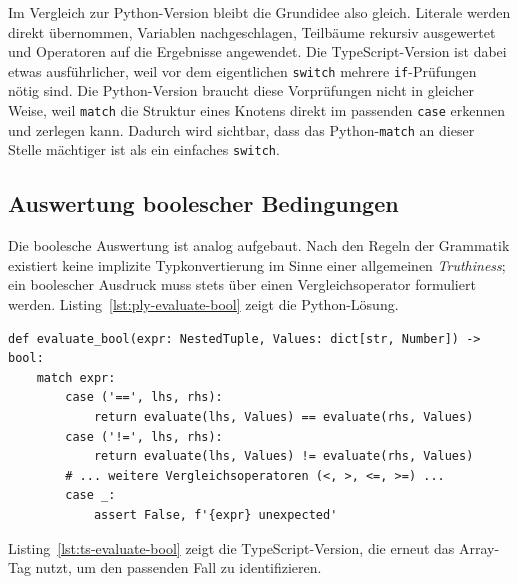 Im Vergleich zur Python-Version bleibt die Grundidee also gleich. Literale werden direkt übernommen, Variablen nachgeschlagen, Teilbäume rekursiv ausgewertet und Operatoren auf die Ergebnisse angewendet. Die TypeScript-Version ist dabei etwas ausführlicher, weil vor dem eigentlichen \texttt{switch} mehrere \texttt{if}-Prüfungen nötig sind. Die Python-Version braucht diese Vorprüfungen nicht in gleicher Weise, weil \texttt{match} die Struktur eines Knotens direkt im passenden \texttt{case} erkennen und zerlegen kann. Dadurch wird sichtbar, dass das Python-\texttt{match} an dieser Stelle mächtiger ist als ein einfaches \texttt{switch}.

\subsection{Auswertung boolescher Bedingungen}

Die boolesche Auswertung ist analog aufgebaut. Nach den Regeln der Grammatik existiert keine implizite Typkonvertierung im Sinne einer allgemeinen \textit{Truthiness}; ein boolescher Ausdruck muss stets über einen Vergleichsoperator formuliert werden. Listing~\ref{lst:ply-evaluate-bool} zeigt die Python-Lösung.

\begin{listing}[htbp]
\caption{Boolesche Auswertung in Python}
\label{lst:ply-evaluate-bool}
\begin{verbatim}
def evaluate_bool(expr: NestedTuple, Values: dict[str, Number]) -> bool:
    match expr:
        case ('==', lhs, rhs):
            return evaluate(lhs, Values) == evaluate(rhs, Values)
        case ('!=', lhs, rhs):
            return evaluate(lhs, Values) != evaluate(rhs, Values)
        # ... weitere Vergleichsoperatoren (<, >, <=, >=) ...
        case _:
            assert False, f'{expr} unexpected'
\end{verbatim}
\end{listing}

Listing~\ref{lst:ts-evaluate-bool} zeigt die TypeScript-Version, die erneut das Array-Tag nutzt, um den passenden Fall zu identifizieren.

